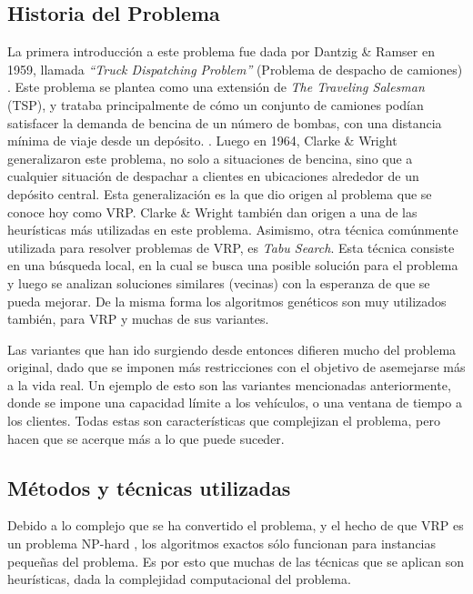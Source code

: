 \documentclass[letter, 10pt]{article}
\begin{document}
\subsection{Historia del Problema}
La primera introducción a este problema fue dada por Dantzig \& Ramser en 1959, llamada \textit{``Truck Dispatching Problem''} (Problema de despacho de camiones) \cite{braekers2016vehicle}. Este problema se plantea como una extensión de \textit{The Traveling Salesman} (TSP), y trataba principalmente de cómo un conjunto de camiones podían satisfacer la demanda de bencina de un número de bombas, con una distancia mínima de viaje desde un depósito. \cite{dantzig1959truck}. Luego en 1964, Clarke \& Wright generalizaron este problema, no solo a situaciones de bencina, sino que a cualquier situación de despachar a clientes en ubicaciones alrededor de un depósito central. Esta generalización es la que dio origen al problema que se conoce hoy como VRP. Clarke \& Wright también dan origen a una de las heurísticas más utilizadas en este problema.  Asimismo, otra técnica comúnmente utilizada para resolver problemas de VRP, es \textit{Tabu Search}\cite{braysy2004evolutionary}. Esta técnica consiste en una búsqueda local, en la cual se busca una posible solución para el problema y luego se analizan soluciones similares (vecinas) con la esperanza de que se pueda mejorar. De la misma forma los algoritmos genéticos son muy utilizados también, para VRP y muchas de sus variantes.

Las variantes que han ido surgiendo desde entonces difieren mucho del problema original, dado que se imponen más restricciones con el objetivo de asemejarse más a la vida real\cite{yan2012model}. Un ejemplo de esto son las variantes mencionadas anteriormente, donde se impone una capacidad límite a los vehículos, o una ventana de tiempo a los clientes. Todas estas son características que complejizan el problema, pero hacen que se acerque más a lo que puede suceder. 

\subsection{Métodos y técnicas utilizadas}
Debido a lo complejo que se ha convertido el problema, y el hecho de que VRP es un problema NP-hard \cite{lenstra1981complexity}, los algoritmos exactos sólo funcionan para instancias pequeñas del problema. Es por esto que muchas de las técnicas que se aplican son heurísticas, dada la complejidad computacional del problema.
\end{document}
